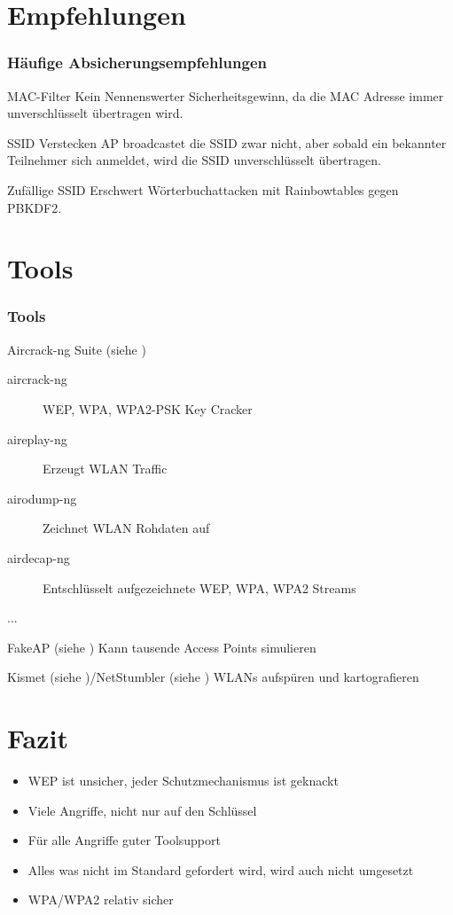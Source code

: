 \documentclass{beamer}
\begin{document}
\section{Empfehlungen}
\begin{frame}
\frametitle{Häufige Absicherungsempfehlungen}
\begin{block}{MAC-Filter}
Kein Nennenswerter Sicherheitsgewinn, da die MAC Adresse immer unverschlüsselt übertragen wird.
\end{block}
\begin{block}{SSID Verstecken}
AP broadcastet die SSID zwar nicht, aber sobald ein bekannter Teilnehmer sich anmeldet, wird die SSID unverschlüsselt übertragen.
\end{block} 
\begin{block}{Zufällige SSID}
Erschwert Wörterbuchattacken mit Rainbowtables gegen PBKDF2.
\end{block}
\end{frame}

\section{Tools}
\begin{frame}
\frametitle{Tools}
\begin{block}{Aircrack-ng Suite (siehe \cite{aircrack})}
	\begin{description}
		\item[aircrack-ng] WEP, WPA, WPA2-PSK Key Cracker
		\item[aireplay-ng] Erzeugt WLAN Traffic
		\item[airodump-ng] Zeichnet WLAN Rohdaten auf
		\item[airdecap-ng] Entschlüsselt aufgezeichnete WEP, WPA, WPA2 Streams
		\item[...]
	\end{description}
\end{block}
\begin{block}{FakeAP (siehe \cite{fakeap})}
Kann tausende Access Points simulieren
\end{block}
\begin{block}{Kismet (siehe \cite{kismet})/NetStumbler (siehe \cite{netstumbler})}
WLANs aufspüren und kartografieren
\end{block}
\end{frame}

\section{Fazit}
\begin{frame}
\begin{itemize}
\frametitle{Fazit}
	\item WEP ist unsicher, jeder Schutzmechanismus ist geknackt
	\item Viele Angriffe, nicht nur auf den Schlüssel
	\item Für alle Angriffe guter Toolsupport
	\item Alles was nicht im Standard gefordert wird, wird auch nicht umgesetzt
	\item WPA/WPA2 relativ sicher
\end{itemize}
\end{frame}
\end{document}
